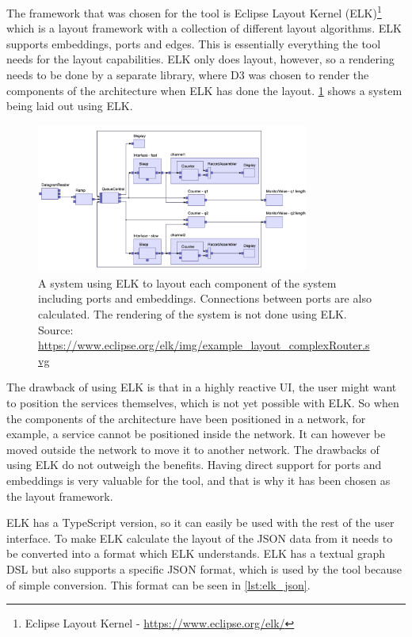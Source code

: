 The framework that was chosen for the tool is Eclipse Layout Kernel (ELK)\footnote{Eclipse Layout Kernel - \url{https://www.eclipse.org/elk/}}
which is a layout framework with a collection of different layout algorithms. ELK supports embeddings, ports and edges. This is essentially everything the tool needs for the layout capabilities.
ELK only does layout, however, so a rendering needs to be done by a separate library, where D3 was chosen to render the components of the architecture when ELK has done the layout.
\cref{figure:elk_example} shows a system being laid out using ELK.

\begin{figure}[h!]
    \center
    \includegraphics[width=0.80\textwidth]{figures/elk.png}
    \caption{A system using ELK to layout each component of the system including ports and embeddings. Connections between ports are also calculated. The rendering of the system is not done using ELK. Source: \url{https://www.eclipse.org/elk/img/example_layout_complexRouter.svg}}
    \label{figure:elk_example}
\end{figure}

The drawback of using ELK is that in a highly reactive UI, the user might want to position the services themselves, which is not yet possible with ELK.
So when the components of the architecture have been positioned in a network, for example, a service cannot be positioned inside the network. It can however be moved outside the network to move it to another network.
The drawbacks of using ELK do not outweigh the benefits. Having direct support for ports and embeddings is very valuable for the tool, and that is why it has been chosen as the layout framework.

ELK has a TypeScript version, so it can easily be used with the rest of the user interface. To make ELK calculate the layout of the JSON data from \javatoolname[] it needs to be converted into a format which ELK understands.
ELK has a textual graph DSL but also supports a specific JSON format, which is used by the tool because of simple conversion. This format can be seen in \cref{lst:elk_json}.

